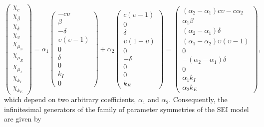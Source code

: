 \documentclass[12pt]{article}
\begin{document}
\begin{equation}
\begin{pmatrix}\chi_{c}\\\chi_{\beta}\\\chi_{\delta}\\\chi_{\upsilon}\\\chi_{\mu_{S}}\\\chi_{\mu_{E}}\\\chi_{\mu_{I}}\\\chi_{k_{I}}\\\chi_{k_{E}}\end{pmatrix}=\alpha_{1}\begin{pmatrix}- c \upsilon\\\beta\\- \delta\\\upsilon \left(\upsilon - 1\right)\\0\\\delta\\0\\k_{I}\\0\end{pmatrix}+\alpha_{2}\begin{pmatrix}c \left(\upsilon - 1\right)\\0\\\delta\\\upsilon \left(1 - \upsilon\right)\\0\\- \delta\\0\\0\\k_{E}\end{pmatrix}=\begin{pmatrix}(\alpha_{2}-\alpha_{1})c\upsilon-c\alpha_{2}\\\alpha_{1}\beta \\(\alpha_{2}-\alpha_{1})\delta \\(\alpha_{1}-\alpha_{2})\upsilon \left(\upsilon - 1\right)\\0\\-(\alpha_{2}-\alpha_{1})\delta\\0\\\alpha_{1}k_{I}\\\alpha_{2}k_{E}\end{pmatrix},\label{eq:null_space_solution}
\end{equation}
which depend on two arbitrary coefficients, $\alpha_{1}$ and $\alpha_{2}$. Consequently, the infinitesimal generators of the family of parameter symmetries of the SEI model are given by
\end{document}
